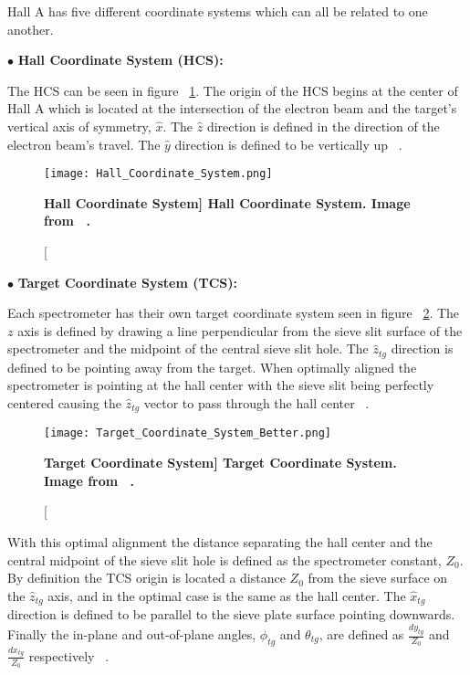 Hall A has five different coordinate systems which can all be related to one another. 

\noindent $\bullet$ \textbf{Hall Coordinate System (HCS):}

The HCS can be seen in figure ~\ref{fig:hcs}. The origin of the HCS begins at the center of Hall A which is located at the intersection of the electron beam and the target's vertical axis of symmetry, $\hat{x}$. The $\hat{z}$ direction is defined in the direction of the electron beam's travel. The $\hat{y}$ direction is defined to be vertically up ~\cite{optics}.

\begin{figure}[!ht]
\begin{center}
\texttt{[image: Hall\_Coordinate\_System.png]}
\end{center}
\caption[\bf{Hall Coordinate System}]{
{\bf{Hall Coordinate System.}} Image from ~\cite{optics}.}
\label{fig:hcs}
\end{figure}

\noindent $\bullet$ \textbf{Target Coordinate System (TCS):}

Each spectrometer has their own target coordinate system seen in figure ~\ref{fig:tcs}. The $z$ axis is defined by drawing a line perpendicular from the sieve slit surface of the spectrometer and the midpoint of the central sieve slit hole. The $\hat{z}_{tg}$ direction is defined to be pointing away from the target. When optimally aligned the spectrometer is pointing at the hall center with the sieve slit being perfectly centered causing the $\hat{z}_{tg}$ vector to pass through the hall center ~\cite{optics}. 

\begin{figure}[!ht]
\begin{center}
\texttt{[image: Target\_Coordinate\_System\_Better.png]}
\end{center}
\caption[\bf{Target Coordinate System}]{
{\bf{Target Coordinate System.}} Image from ~\cite{Thesis:Ye}.}
\label{fig:tcs}
\end{figure}

With this optimal alignment the distance separating the hall center and the central midpoint of the sieve slit hole is defined as the spectrometer constant, $Z_0$. By definition the TCS origin is located a distance $Z_0$ from the sieve surface on the $\hat{z}_{tg}$ axis, and in the optimal case is the same as the hall center. The  $\hat{x}_{tg}$ direction is defined to be parallel to the sieve plate surface pointing downwards. Finally the in-plane and out-of-plane angles, $\phi_{tg}$ and $\theta_{tg}$, are defined as $\frac{dy_{tg}}{Z_0}$ and $\frac{dx_{tg}}{Z_0}$ respectively ~\cite{optics}.

